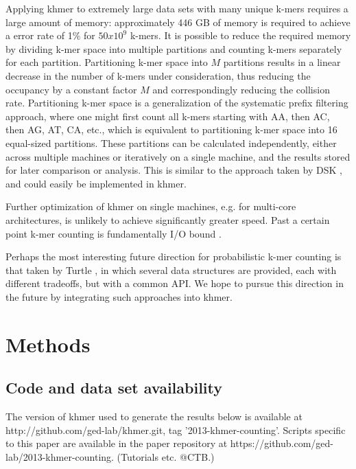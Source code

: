 \documentclass{article}
\begin{document}
Applying khmer to extremely large data sets with many unique k-mers
requires a large amount of memory: approximately 446 GB of memory is
required to achieve a error rate of 1\% for
$50x10^9$ k-mers. It is possible to reduce the required memory by dividing
k-mer space into multiple partitions and counting k-mers separately
for each partition. Partitioning k-mer space into $M$ partitions
results in a linear decrease in the number of k-mers under
consideration, thus reducing the occupancy by a constant factor $M$
and correspondingly reducing the collision rate.  Partitioning k-mer
space is a generalization of the systematic prefix filtering approach,
where one might first count all k-mers starting with AA, then AC, then
AG, AT, CA, etc., which is equivalent to partitioning k-mer space into
16 equal-sized partitions. These partitions can be calculated
independently, either across multiple machines or iteratively on a
single machine, and the results stored for later comparison or
analysis.  This is similar to the approach taken by DSK
\cite{Rizk2013}, and could easily be implemented in khmer.

Further optimization of khmer on single machines, e.g. for multi-core
architectures, is unlikely to achieve significantly greater speed.
Past a certain point k-mer counting is fundamentally I/O bound
\cite{McDonald2013}.

Perhaps the most interesting future direction for probabilistic k-mer
counting is that taken by Turtle \cite{Roy2013}, in which several
data structures are provided, each with different tradeoffs, but with
a common API.  We hope to pursue this direction in the future by
integrating such approaches into khmer.

\section{Methods}

\subsection{Code and data set availability}


The version of khmer used to generate the results below is available
at http://github.com/ged-lab/khmer.git, tag '2013-khmer-counting'.
Scripts specific to this paper are available in the paper repository
at https://github.com/ged-lab/2013-khmer-counting.  (Tutorials etc. @CTB.)
\end{document}
